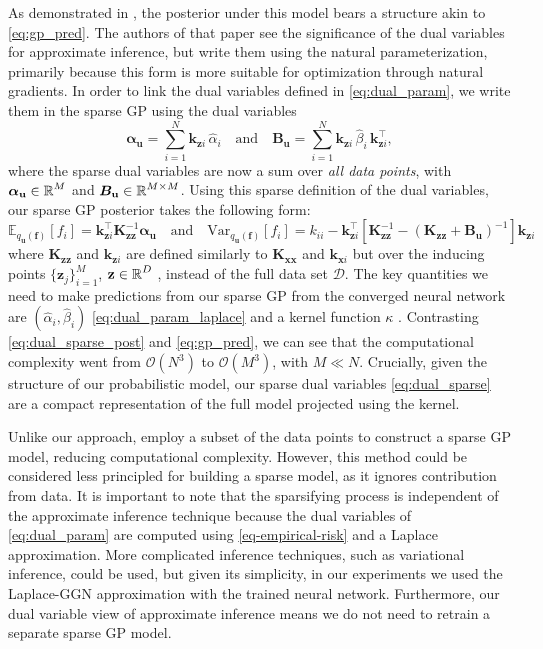 \documentclass{article}
\newcommand{\dataset}{\ensuremath{\mathcal{D}}}
\newcommand{\mathbold}[1]{\bm{#1}}
\newcommand{\mbf}[1]{\mathbf{#1}}
\newcommand{\T}{\top}
\newcommand{\valpha}[0]{\mathbold{\alpha}}
\newcommand{\MBeta}[0]{\mathbold{B}}
\newcommand{\vz}{\mbf{z}}
\newcommand{\vf}{\mbf{f}}
\newcommand{\vu}{\mbf{u}}
\newcommand{\vx}{\mbf{x}}
\newcommand{\MKzz}{\mbf{K}_{\mbf{z}\mbf{z}}}
\newcommand{\MKxx}{\mbf{K}_{\mbf{x}\mbf{x}}}
\newcommand{\vkzi}{\mbf{k}_{\mbf{z}i}}
\newcommand{\vkzs}{\mbf{k}_{\mbf{z}i}}
\newcommand{\vk}{\mbf{k}}
\newcommand{\myexpect}{\mathbb{E}}
\begin{document}
As demonstrated in \cite{adam2021dual}, the posterior under this model bears a structure akin to \cref{eq:gp_pred}. The authors of that paper see the significance of the dual variables for approximate inference, but write them using the natural parameterization, primarily because this form is more suitable for optimization through natural gradients. In order to link the dual variables defined in \cref{eq:dual_param}, we write them in the sparse GP using the dual variables
%
\begin{equation} \textstyle
  \valpha_{\vu}  =  \sum_{i=1}^N  \vkzi \, \hat{\alpha}_{i}
  \quad \text{and} \quad
  \MBeta_{\vu} =  \sum_{i=1}^N \vkzi \,\hat{\beta}_{i} \, \vkzi^{\T} ,    
\label{eq:dual_sparse}
\end{equation}
%
where the sparse dual variables are now a sum over \emph{all data points}, with $\valpha_{\vu} \in \R^{M}$ and $\MBeta_{\vu} \in \R^{M  \times M}$. Using this sparse definition of the dual variables, our sparse GP posterior takes the following form:
\begin{equation}\label{eq:dual_sparse_post}
   \myexpect_{q_{\vu}(\vf)}[f_i] = \vkzs^{\T} \MKzz^{-1} \valpha_{\vu}
   \quad \text{and} \quad 
   \textrm{Var}_{q_{\vu}(\vf)}[f_i]  = k_{ii} - \vkzs^\top [\MKzz^{-1} - (\MKzz + \MBeta_{\vu})^{-1} ]\vkzs
\end{equation}
where $\MKzz$ and $\vkzs$ are defined similarly to $\MKxx$ and $\vk_{\vx i}$ but over the inducing points $\{\vz_j\}_{i=1}^M$, $\vz \in \R^{D}$ , instead of the full data set $\dataset$. The key quantities we need to make predictions from our sparse GP from the converged neural network are $(\hat{\alpha}_i, \hat{\beta}_i)$ \cref{eq:dual_param_laplace} and a kernel function $\kappa$ . Contrasting \cref{eq:dual_sparse_post} and \cref{eq:gp_pred}, we can see that the computational complexity went from $\mathcal{O}(N^3)$ to $\mathcal{O}(M^3)$, with $M \ll N$.  Crucially, given the structure of our probabilistic model, our sparse dual variables \cref{eq:dual_sparse} are a compact representation of the full model projected using the kernel. 

Unlike our approach, \citet{immer2021improving} employ a subset of the data points to construct a sparse GP model, reducing computational complexity. However, this method could be considered less principled for building a sparse model, as it ignores contribution from data. It is important to note that the sparsifying process is independent of the approximate inference technique because the dual variables of \cref{eq:dual_param} are computed using \cref{eq-empirical-risk} and a Laplace approximation.
More complicated inference techniques, such as variational inference, could be used, but given its simplicity, in our experiments we used the Laplace-GGN approximation with the trained neural network. Furthermore, our dual variable view of approximate inference means we do not need to retrain a separate sparse GP model.%
\end{document}
